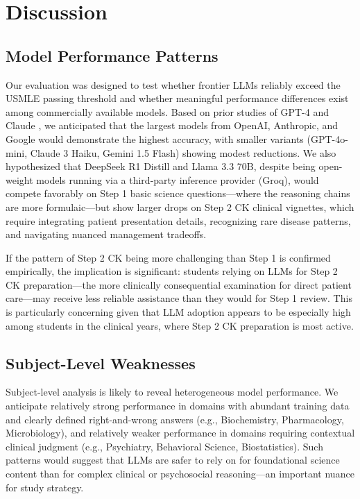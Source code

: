 \section{Discussion}

\subsection{Model Performance Patterns}

Our evaluation was designed to test whether frontier LLMs reliably exceed the USMLE passing threshold and whether meaningful performance differences exist among commercially available models. Based on prior studies of GPT-4 \parencite{nori2023gpt4usmle} and Claude \parencite{anthropic2024claude3}, we anticipated that the largest models from OpenAI, Anthropic, and Google would demonstrate the highest accuracy, with smaller variants (GPT-4o-mini, Claude 3 Haiku, Gemini 1.5 Flash) showing modest reductions. We also hypothesized that DeepSeek R1 Distill and Llama 3.3 70B, despite being open-weight models running via a third-party inference provider (Groq), would compete favorably on Step 1 basic science questions—where the reasoning chains are more formulaic—but show larger drops on Step 2 CK clinical vignettes, which require integrating patient presentation details, recognizing rare disease patterns, and navigating nuanced management tradeoffs.

If the pattern of Step 2 CK being more challenging than Step 1 is confirmed empirically, the implication is significant: students relying on LLMs for Step 2 CK preparation—the more clinically consequential examination for direct patient care—may receive less reliable assistance than they would for Step 1 review. This is particularly concerning given that LLM adoption appears to be especially high among students in the clinical years, where Step 2 CK preparation is most active.

\subsection{Subject-Level Weaknesses}

Subject-level analysis is likely to reveal heterogeneous model performance. We anticipate relatively strong performance in domains with abundant training data and clearly defined right-and-wrong answers (e.g., Biochemistry, Pharmacology, Microbiology), and relatively weaker performance in domains requiring contextual clinical judgment (e.g., Psychiatry, Behavioral Science, Biostatistics). Such patterns would suggest that LLMs are safer to rely on for foundational science content than for complex clinical or psychosocial reasoning—an important nuance for study strategy.

